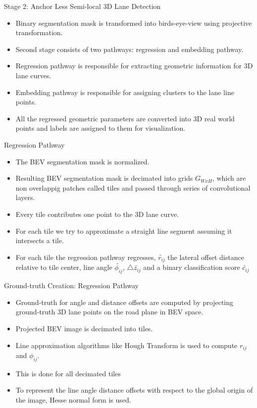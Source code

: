 \documentclass[aspectratio=169]{beamer}
\begin{document}
\begin{frame}{Stage 2: Anchor Less Semi-local 3D Lane Detection}
\begin{itemize}
    \item Binary segmentation mask is transformed into birds-eye-view using projective transformation.
    \item Second stage consists of two pathways: regression and embedding pathway.
    \item Regression pathway is responsible for extracting geometric information for 3D lane curves.
    \item Embedding pathway is responsible for assigning clusters to the lane line points.
    \item All the regressed geometric parameters are converted into 3D real world points and labels are assigned to them for visualization.
\end{itemize}
\end{frame}

\begin{frame}{Regression Pathway}    
    \begin{itemize}
        \item The BEV segmentation mask is normalized.
        \item Resulting BEV segmentation mask is decimated into grids $G_{WxH}$, which are non overlappig patches called tiles and passed through series of convolutional layers.
        \item Every tile contributes one point to the 3D lane curve.
        \item For each tile we try to approximate a straight line segment assuming it intersects a tile.
        \item For each tile the regression pathway regresses, $\widetilde{r_{ij}}$ the lateral offset distance relative to tile center, line angle $\widetilde{\phi_{ij}}$, $\triangle{\widetilde{z_{ij}}}$ and a binary classification score $\widetilde{c_{ij}}$ 
    \end{itemize}
    
\end{frame}

\begin{frame}{Ground-truth Creation: Regression Pathway}
    \begin{itemize}
        \item  Ground-truth for angle and distance offsets are computed by projecting ground-truth 3D lane points on the road plane in BEV space.
        \item Projected BEV image is decimated into tiles.
        \item Line approximation algorithms like Hough Transform is used to compute $r_{ij}$ and $\phi_{ij}$.
        \item This is done for all decimated tiles
        \item To represent the line angle distance offsets with respect to the global origin of the image, Hesse normal form is used.
    \end{itemize}

     
\end{frame}
\end{document}
